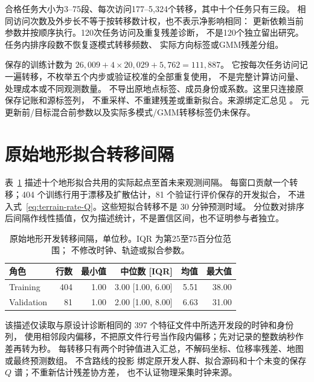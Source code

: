 合格任务大小为3--75段、每次访问177--5,324个转移，其中十个任务只有三段。
相同访问次数及外步长不等于按转移数计权，也不表示净影响相同：
更新依赖当前参数并按顺序执行。120次任务访问及重复残差诊断，
不是120个独立留出研究。任务内排序段数不恢复逐模式转移频数、
实际方向标签或GMM残差分组。

保存的训练计数为
$26{,}009+4\times20{,}029+5{,}762=111{,}887$。
它按每次任务访问记一遍转移，不枚举五个内步或验证校准的全部重复使用，
不是完整计算访问量、处理成本或不同观测数量。
不导出原地点标签、成员身份或系数。这里只连接原保存记账和源标签列，
不重采样、不重建残差或重新拟合。来源绑定汇总见
。
元更新前/目标混合前参数以及实际多模式/GMM转移标签仍未保存。


\section{原始地形拟合转移间隔}
\label{sec:terrain-fit-intervals}\hypertarget{sec:terrain-fit-intervals}{}
表~\ref{tab:terrain-fit-intervals} 描述十个地形拟合共用的实际起点至首未来观测间隔。
每窗口贡献一个转移；404 个训练行用于漂移及扩散估计，81 个验证行评价保存的开发拟合，
不进入式~\eqref{eq:terrain-rate-Q}。这些短拟合转移不是 30 分钟预测时域。
分位数对排序后间隔作线性插值，仅为描述统计，不是置信区间，也不证明参与者独立。

\begin{table}[htbp]
\centering\footnotesize
\caption{原始地形开发转移间隔，单位秒。IQR 为第25至75百分位范围；
不修改时钟、轨迹或拟合参数。}
\label{tab:terrain-fit-intervals}\hypertarget{tab:terrain-fit-intervals}{}
\begin{tabular}{lrrrrr}
\toprule
角色 & 行数 & 最小值 & 中位数 [IQR] & 均值 & 最大值\\
\midrule
Training & 404 & 1.00 & 3.00 [1.00, 6.00] & 5.51 & 38.00\\
Validation & 81 & 1.00 & 2.00 [1.00, 8.00] & 6.63 & 31.00\\
\bottomrule
\end{tabular}
\end{table}

该描述仅读取与原设计诊断相同的 397 个特征文件中所选开发段的时钟和身份列，
使用相邻段内偏移，不把原文件行号当作段内偏移；先对记录的整数纳秒作差再转为秒。
每转移只有两个时钟值进入汇总，不解码坐标、位移率残差、地图或最终预测数组。
不含路线的投影 
绑定原开发人群、拟合源码和十个未变的保存 $Q$ 谱；不重新估计残差协方差，
也不认证物理采集时钟来源。


